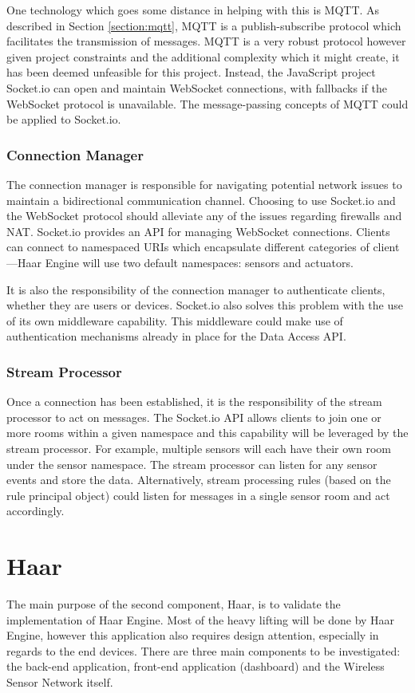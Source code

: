       One technology which goes some distance in helping with this is MQTT. As described in Section \ref{section:mqtt}, MQTT is a publish-subscribe protocol which facilitates the transmission of messages. MQTT is a very robust protocol however given project constraints and the additional complexity which it might create, it has been deemed unfeasible for this project. Instead, the JavaScript project Socket.io can open and maintain WebSocket connections, with fallbacks if the WebSocket protocol is unavailable. The message-passing concepts of MQTT could be applied to Socket.io.

      \subsubsection{Connection Manager}
        The connection manager is responsible for navigating potential network issues to maintain a bidirectional communication channel. Choosing to use Socket.io and the WebSocket protocol should alleviate any of the issues regarding firewalls and NAT. Socket.io provides an API for managing WebSocket connections. Clients can connect to namespaced URIs which encapsulate different categories of client---Haar Engine will use two default namespaces: sensors and actuators.

        It is also the responsibility of the connection manager to authenticate clients, whether they are users or devices. Socket.io also solves this problem with the use of its own middleware capability. This middleware could make use of authentication mechanisms already in place for the Data Access API.

      \subsubsection{Stream Processor}
        Once a connection has been established, it is the responsibility of the stream processor to act on messages. The Socket.io API allows clients to join one or more rooms within a given namespace and this capability will be leveraged by the stream processor. For example, multiple sensors will each have their own room under the sensor namespace. The stream processor can listen for any sensor events and store the data. Alternatively, stream processing rules (based on the rule principal object) could listen for messages in a single sensor room and act accordingly.

  \section{Haar}
    The main purpose of the second component, Haar, is to validate the implementation of Haar Engine. Most of the heavy lifting will be done by Haar Engine, however this application also requires design attention, especially in regards to the end devices. There are three main components to be investigated: the back-end application, front-end application (dashboard) and the Wireless Sensor Network itself.

